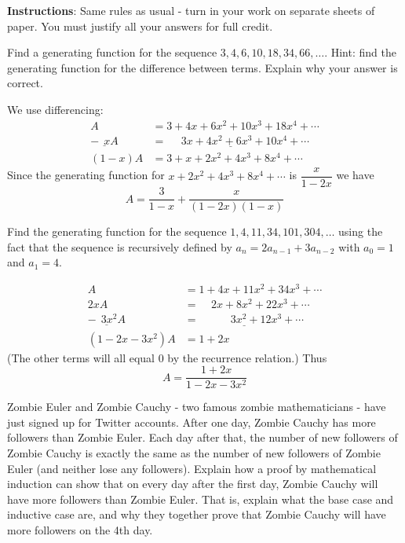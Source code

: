 \documentclass[11pt]{exam}
\begin{document}
\noindent \textbf{Instructions}: Same rules as usual - turn in your work on separate sheets of paper.  You must justify all your answers for full credit.

\begin{questions}

\question[4] Find a generating function for the sequence $3, 4, 6, 10, 18, 34, 66, \ldots$.  Hint: find the generating function for the difference between terms. Explain why your answer is correct.
\begin{solution}
We use differencing:
  \begin{align*}
    A & = 3 + 4x + 6x^2 + 10x^3 + 18x^4 + \cdots \\
    \underline{ - ~~xA } & \underline{ = ~~~~~~ 3x + 4x^2 + 6x^3 + 10x^4 + \cdots }\\
    (1-x)A & = 3 + x + 2x^2 + 4x^3 + 8x^4 + \cdots
  \end{align*}
  Since the generating function for $x + 2x^2 + 4x^3 + 8x^4 + \cdots$ is $\dfrac{x}{1-2x}$ we have
  \[A = \frac{3}{1-x} + \frac{x}{(1-2x)(1-x)}\]
\end{solution}


\question[4] Find the generating function for the sequence $1, 4, 11, 34, 101, 304, \ldots$ using the fact that the sequence is recursively defined by $a_n = 2 a_{n-1} + 3a_{n-2}$ with $a_0 = 1$ and $a_1 = 4$.  

\begin{solution}
  \begin{align*}
    A & = 1 + 4x + 11x^2 + 34x^3 + \cdots \\
    2xA & = ~~~~~ 2x + 8x^2 + 22x^3 + \cdots \\
    \underline{- ~~ 3x^2A } & \underline{ = ~~~~~~~~~~~~~3x^2 + 12x^3 + \cdots} \\
    (1-2x-3x^2)A & = 1 + 2x
  \end{align*}
(The other terms will all equal 0 by the recurrence relation.)  Thus
\[A = \frac{1+2x}{1-2x-3x^2}\]
\end{solution}




\question[4] Zombie Euler and Zombie Cauchy - two famous zombie mathematicians - have just signed up for Twitter accounts.  After one day, Zombie Cauchy has more followers than Zombie Euler.  Each day after that, the number of new followers of Zombie Cauchy is exactly the same as the number of new followers of Zombie Euler (and neither lose any followers).  Explain how a proof by mathematical induction can show that on every day after the first day, Zombie Cauchy will have more followers than Zombie Euler.  That is, explain what the base case and inductive case are, and why they together prove that Zombie Cauchy will have more followers on the 4th day.


\end{questions}
\end{document}
